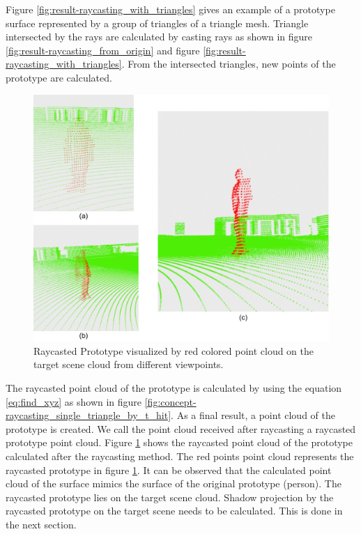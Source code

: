 Figure \ref{fig:result-raycasting_with_triangles} gives an example of a prototype surface represented by a group of triangles of a triangle mesh. Triangle intersected by the rays are calculated by casting rays as shown in figure \ref{fig:result-raycasting_from_origin}  and figure  \ref{fig:result-raycasting_with_triangles}. From the intersected triangles, new points of the prototype are calculated. 

\begin{figure}[htbp]
    \centering
    \includegraphics[width=0.6\linewidth]{97_graphics/results/raycasted_prototype.pdf}
    \caption{Raycasted Prototype visualized by red colored point cloud on the target scene cloud from different viewpoints.}
    \label{fig:result-raycasted_prototype}
\end{figure}

The raycasted point cloud of the prototype is calculated by using the equation \ref{eq:find_xyz} as shown in figure \ref{fig:concept-raycasting_single_triangle_by_t_hit}. As a final result, a point cloud of the prototype is created. We call the point cloud received after raycasting a raycasted prototype point cloud. Figure \ref{fig:result-raycasted_prototype} shows the raycasted point cloud of the prototype calculated after the raycasting method.
The red points point cloud represents the raycasted prototype in figure \ref{fig:result-raycasted_prototype}. It can be observed that the calculated point cloud of the surface mimics the surface of the original prototype (person). The raycasted prototype lies on the target scene cloud. Shadow projection by the raycasted prototype on the target scene needs to be calculated. This is done in the next section.


